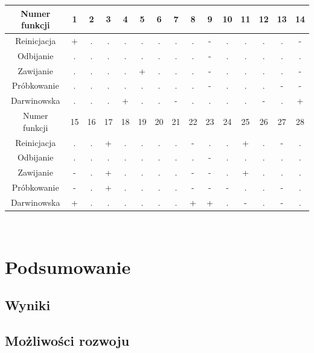 \documentclass{mini}
\begin{document}
\begin{tabular}{|c|c|c|c|c|c|c|c|c|c|c|c|c|c|c|} \hline
Numer funkcji & 1 & 2 & 3 & 4 & 5 & 6 & 7 & 8 & 9 & 10 & 11 & 12 & 13 & 14 \\ \hline
Reinicjacja & + & . & . & . & . & . & . & . & - & . & . & . & . & - \\ \hline
Odbijanie & . & . & . & . & . & . & . & . & - & . & . & . & . & .  \\ \hline
Zawijanie  & . & . & . & . & + & . & . & . & - & . & . & . & . & - \\ \hline
Próbkowanie  & . & . & . & . & . & . & . & . & - & . & . & . & - & - \\ \hline
Darwinowska  & . & . & . & + & . & . & - & . & . & . & . & - & . & +  \\ \hline \hline
Numer funkcji & 15 & 16 & 17 & 18 & 19 & 20 & 21 & 22 & 23 & 24 & 25 & 26 & 27 & 28 \\ \hline
Reinicjacja & . & . & + & . & . & . & . & - & . & . & + & . & - & . \\ \hline
Odbijanie  & . & . & . & . & . & . & . & . & - & . & . & . & . & . \\ \hline
Zawijanie  & - & . & + & . & . & . & . & - & - & . & + & . & . & . \\ \hline
Próbkowanie & - & . & + & . & . & . & . & - & - & - & . & . & - & . \\ \hline
Darwinowska & + & . & . & . & . & . & . & + & + & . & - & . & - & . \\ \hline
\end{tabular} \\



\pagebreak

\section{Podsumowanie}

\subsection{Wyniki}

\subsection{Możliwości rozwoju}

\pagebreak
\end{document}
